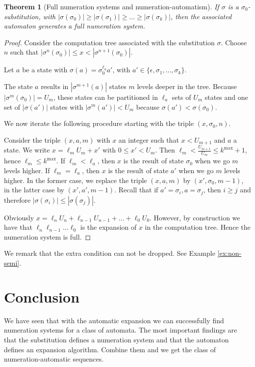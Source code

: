 \documentclass{article}
\newtheorem{theorem}{Theorem}[subsection]
\theoremstyle{definition}
\begin{document}
\begin{theorem}[Full numeration systems and numeration-automatism] 
\label{thm:fsa}
If $\sigma$ is a $\sigma_0$-substitution, with 
$|\sigma(\sigma_0)| \ge |\sigma(\sigma_1)| \ge \ldots \ge |\sigma(\sigma_k)|$, 
then the associated automaton generates a full numeration system.
\end{theorem}
\begin{proof}
Consider the computation tree associated with the substitution $\sigma$. Choose
$n$ such that $|\sigma^n(\sigma_0)| \le x < |\sigma^{n + 1}(\sigma_0)|$.

Let $a$ be a state with $\sigma(a) = \sigma_0^{\ell_a} a'$, with 
$a' \in \{\epsilon, \sigma_1, \ldots, \sigma_k\}$.

The state $a$ results in $|\sigma^{m + 1}(a)|$ states $m$ levels deeper in 
the tree. Because $|\sigma^m(\sigma_0)| = U_m$, these states can be partitioned
in $\ell_a$ sets of $U_m$ states and one set of $|\sigma(a')|$ states with
$|\sigma^m(a')| < U_m$ because $\sigma(a') < \sigma(\sigma_0)$.

We now iterate the following procedure starting with the triple 
$(x, \sigma_0, n)$.

Consider the triple $(x, a, m)$ with $x$ an integer such that $x < U_{m + 1}$
and $a$ a state. We write $x = \ell_m U_m + x'$ with $0 \le x'< U_m$. Then
$\ell_m < \frac{U_{m + 1}}{U_m} \le k^{\mathrm{max}} + 1$, hence 
$\ell_m \le k^{\mathrm{max}}$. If $\ell_m < \ell_a$, then $x$ is the result
of state $\sigma_0$ when we go $m$ levels higher. If $\ell_m = \ell_a$, then
$x$ is the result of state $a'$ when we go $m$ levels higher. In the former
case, we replace the triple $(x, a, m)$ by $(x', \sigma_0, m - 1)$, in the
latter case by $(x', a', m - 1)$. Recall that if $a' = \sigma_i, a = \sigma_j$,
then $i \ge j$ and therefore $|\sigma(\sigma_i)| \le |\sigma(\sigma_j)|$.

Obviously $x = \ell_n U_n + \ell_{n - 1} U_{n - 1} + \ldots + \ell_0 U_0$.
However, by construction we have that $\ell_n \ell_{n - 1} \ldots \ell_0$ is
the expansion of $x$ in the computation tree. Hence the numeration system is
full.
\end{proof}

We remark that the extra condition can not be dropped. See Example 
\ref{ex:non-semi}.

\section{Conclusion}
We have seen that with the automatic expansion we can successfully find 
numeration systems for a class of automata. The most important findings are
that the substitution defines a numeration system and that the automaton 
defines an expansion algorithm. Combine them and we get the class of 
numeration-automatic sequences.
\end{document}
